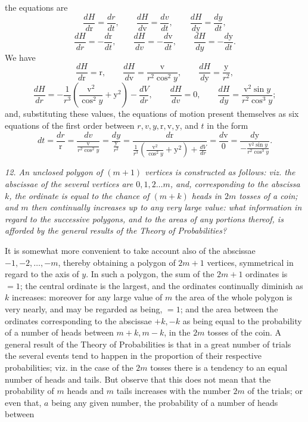 \documentclass[11pt,a4paper]{article}
\theoremstyle{plain}
\theoremstyle{definition}
\newcommand{\sect}[1]{\medskip\noindent\textit{#1}}
\begin{document}
\noindent
the equations are
\[
\frac{dH}{d\mathrm r}=\frac{dr}{dt},\qquad
\frac{dH}{d\mathrm v}=\frac{dv}{dt},\qquad
\frac{dH}{d\mathrm y}=\frac{dy}{dt},
\]
\[
\frac{dH}{dr}=-\frac{d\mathrm r}{dt},\qquad
\frac{dH}{dv}=-\frac{d\mathrm v}{dt},\qquad
\frac{dH}{dy}=-\frac{d\mathrm y}{dt}.
\]
We have
\[
\frac{dH}{d\mathrm r}=\mathrm r,\qquad
\frac{dH}{d\mathrm v}=\frac{\mathrm v}{r^2\cos^2y},\qquad
\frac{dH}{d\mathrm y}=\frac{\mathrm y}{r^2},
\]
\[
\frac{dH}{dr}=-\frac1{r^3}\left(\frac{\mathrm v^2}{\cos^2y}+\mathrm y^2\right)
-\frac{dV}{dr},\qquad
\frac{dH}{dv}=0,\qquad
\frac{dH}{dy}=\frac{\mathrm v^2\sin y}{r^2\cos^3 y};
\]
and, substituting these values, the equations of motion present themselves as six
equations of the first order between $r,v,y,\mathrm r,\mathrm v,\mathrm y$, and $t$ in
the form
\[
dt=\frac{dr}{\mathrm r}
=\frac{dv}{\displaystyle \frac{\mathrm v}{r^2\cos^2y}}
=\frac{dy}{\displaystyle \frac{\mathrm y}{r^2}}
=\frac{d\mathrm r}{\displaystyle
\frac1{r^3}\left(\frac{\mathrm v^2}{\cos^2y}+\mathrm y^2\right)+\frac{dV}{dr}}
=\frac{d\mathrm v}{0}
=\frac{d\mathrm y}{\displaystyle -\frac{\mathrm v^2\sin y}{r^2\cos^3y}}.
\]

\sect{12. An unclosed polygon of $(m+1)$ vertices is constructed as follows: viz.
the abscissae of the several vertices are $0,1,2\ldots m$, and, corresponding to the
abscissa $k$, the ordinate is equal to the chance of $(m+k)$ heads in $2m$ tosses of
a coin; and $m$ then continually increases up to any very large value: what
information in regard to the successive polygons, and to the areas of any portions
thereof, is afforded by the general results of the Theory of Probabilities?}

It is somewhat more convenient to take account also of the abscissae
$-1,-2,\ldots,-m$, thereby obtaining a polygon of $2m+1$ vertices, symmetrical in
regard to the axis of $y$. In such a polygon, the sum of the $2m+1$ ordinates is
$=1$; the central ordinate is the largest, and the ordinates continually diminish as
$k$ increases: moreover for any large value of $m$ the area of the whole polygon is
very nearly, and may be regarded as being, $=1$; and the area between the
ordinates corresponding to the abscissae $+k,-k$ as being equal to the probability of
a number of heads between $m+k,m-k$, in the $2m$ tosses of the coin. A general
result of the Theory of Probabilities is that in a great number of trials the several
events tend to happen in the proportion of their respective probabilities; viz. in the
case of the $2m$ tosses there is a tendency to an equal number of heads and tails.
But observe that this does not mean that the probability of $m$ heads and $m$ tails
increases with the number $2m$ of the trials; or even that, $a$ being any given
number, the probability of a number of heads between
\clearpage
\end{document}
